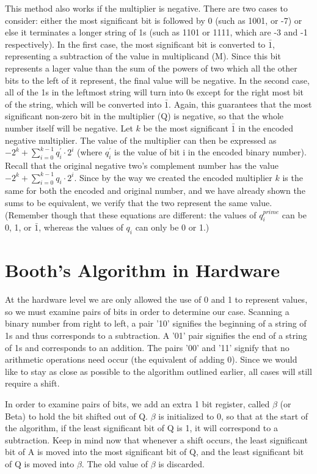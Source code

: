\documentclass{article}
\begin{document}
This method also works if the multiplier is negative.
There are two cases to consider: either the most significant bit is followed by 0 (such as 1001, or -7) or else it terminates a longer string of 1s (such as 1101 or 1111, which are -3 and -1 respectively).
In the first case, the most significant bit is converted to $\bar{1}$, representing a subtraction of the value in multiplicand (M).
Since this bit represents a lager value than the sum of the powers of two which all the other bits to the left of it represent, the final value will be negative.
In the second case, all of the 1s in the leftmost string will turn into 0s except for the right most bit of the string, which will be converted into $\bar{1}$.
Again, this guarantees that the most significant non-zero bit in the multiplier (Q) is negative, so that the whole number itself will be negative.
Let $k$ be the most significant $\bar{1}$ in the encoded negative multiplier.
The value of the multiplier can then be expressed as $-2^k + \sum_{i=0}^{k-1} q_i^{\prime} \cdot 2^i$ (where $q_i^{\prime}$ is the value of bit i in the encoded binary number).
Recall that the original negative two's complement number has the value $-2^k + \sum_{i=0}^{k-1} q_i \cdot 2^i$.
Since by the way we created the encoded multiplier $k$ is the same for both the encoded and original number, and we have already shown the sums to be equivalent, we verify that the two represent the same value.
(Remember though that these equations are different: the values of $q_i^{prime}$ can be 0, 1, or $\bar{1}$, whereas the values of $q_i$ can only be 0 or 1.)

\section{Booth's Algorithm in Hardware}
    At the hardware level we are only allowed the use of 0 and 1 to represent values, so we must examine pairs of bits in order to determine our case.
Scanning a binary number from right to left, a pair '10' signifies the beginning of a string of 1s and thus corresponds to a subtraction.
A '01' pair signifies the end of a string of 1s and corresponds to an addition.
The pairs '00' and '11' signify that no arithmetic operations need occur (the equivalent of adding 0).
Since we would like to stay as close as possible to the algorithm outlined earlier, all cases will still require a shift.

    In order to examine pairs of bits, we add an extra 1 bit register, called $\beta$ (or Beta) to hold the bit shifted out of Q.
$\beta$ is initialized to 0, so that at the start of the algorithm, if the least significant bit of Q is 1, it will correspond to a subtraction.
Keep in mind now that whenever a shift occurs, the least significant bit of A is moved into the most significant bit of Q, and the least significant bit of Q is moved into $\beta$.
The old value of $\beta$ is discarded.
\end{document}
